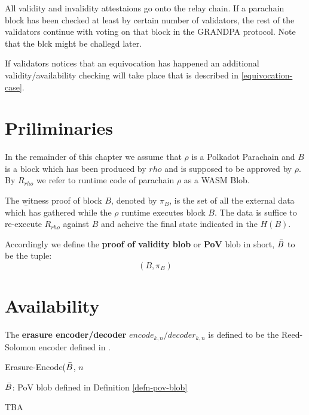 All validity and invalidity attestaions go onto the relay chain. If a parachain block has been checked at least by certain number of validators, the rest of the validators continue with voting on that block in the GRANDPA protocol. Note that the blck might be challegd later. 
	 
If validators notices that an equivocation has happened an additional validity/availability checking will take place that is described in \ref{equivocation-case}. 

\section{Priliminaries}

\begin{definition}
  In the remainder of this chapter we assume that $\rho$ is a Polkadot Parachain and $B$ is a block which has been produced by $rho$ and is supposed to be approved by $\rho$. By $R_{rho}$ we refer to runtime code of parachain $\rho$  as a WASM Blob. 
\end{definition}

\begin{definition}
  \label{defn-witness-proof}
  The {\b witness proof} of block $B$, denoted by {\bf $\pi_B$}, is the set of all the external data which has gathered while the $\rho$ runtime executes block $B$. The data is suffice to re-execute $R_{rho}$ against $B$ and acheive the final state indicated in the $H(B)$.
\end{definition}

\begin{definition}
  \label{defn-pov-blob}
  Accordingly we define the {\bf proof of validity blob} or {\bf PoV} blob in short, {\bf $\bar{B}$} to be the tuple:
  \[
  (B, \pi_B)
  \]
\end{definition}

\section{Availability}

\begin{definition}
  \label{defn-erasure-encoder-decoder}
  The {\bf erasure encoder/decoder} {\bf $encode_{k,n}/decoder_{k,n}$ } is defined to be the Reed-Solomon encoder defined in \cite{??}. 
\end{definition}

\begin{algorithm}
  \caption[]{\sc Erasure-Encode($\bar{B}$, $n$}
  \label{algo-erasure-encode}
  \begin{algorithmic}[1]
  \Require
    $\bar{B}$: PoV blob defined in Definition \ref{defn-pov-blob}
  
    \State TBA
  \end{algorithmic}
\end{algorithm}

